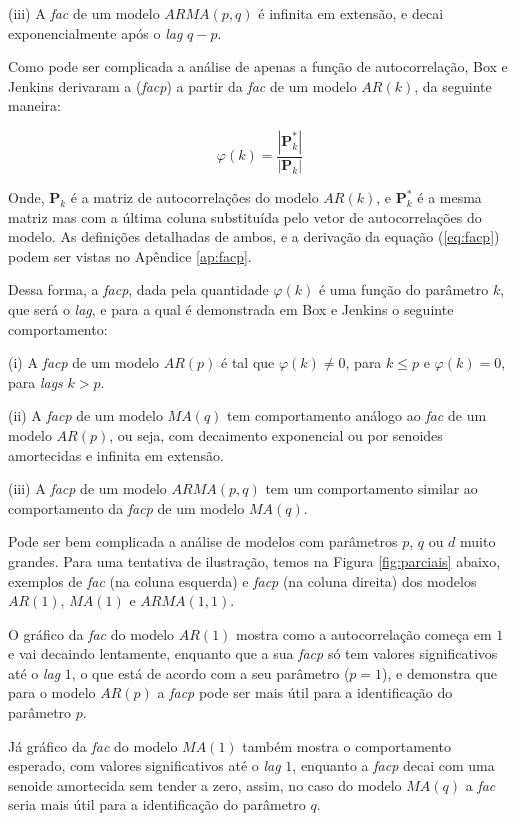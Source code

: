 (iii) A \emph{fac} de um modelo $ARMA(p, q)$ é infinita em extensão, e decai exponencialmente após o \emph{lag} $q{-}p$.

Como pode ser complicada a análise de apenas a função de autocorrelação, Box e Jenkins \citep{box} derivaram a  (\emph{facp}) a partir da \emph{fac} de um modelo $AR(k)$, da seguinte maneira:

\begin{equation}\label{eq:facp}
\varphi(k) = \dfrac{|\mathbf{P}_k^*|}{|\mathbf{P}_k|}
\end{equation}

Onde, $\mathbf{P}_k$ é a matriz de autocorrelações do modelo $AR(k)$, e $\mathbf{P}_k^*$ é a mesma matriz mas com a última coluna substituída pelo vetor de autocorrelações do modelo. As definições detalhadas de ambos, e a derivação da equação (\ref{eq:facp}) podem ser vistas no Apêndice \ref{ap:facp}.

Dessa forma, a \emph{facp}, dada pela quantidade $\varphi(k)$ é uma função do parâmetro $k$, que será o \emph{lag}, e para a qual é demonstrada em Box e Jenkins \citep{box} o seguinte comportamento:

(i) A \emph{facp} de um modelo $AR(p)$ é tal que $\varphi(k) \neq 0$, para $k \leq p$ e $\varphi(k) = 0$, para \emph{lags} $k > p$.

(ii) A \emph{facp} de um modelo $MA(q)$ tem comportamento análogo ao \emph{fac} de um modelo $AR(p)$, ou seja, com decaimento exponencial ou por senoides amortecidas e infinita em extensão.

(iii) A \emph{facp} de um modelo $ARMA(p, q)$ tem um comportamento similar ao comportamento da \emph{facp} de um modelo $MA(q)$.

Pode ser bem complicada a análise de modelos com parâmetros $p$, $q$ ou $d$ muito grandes. Para uma tentativa de ilustração, temos na Figura \ref{fig:parciais} abaixo, exemplos de \emph{fac} (na coluna esquerda) e \emph{facp} (na coluna direita) dos modelos $AR(1)$, $MA(1)$ e $ARMA(1, 1)$.

O gráfico da \emph{fac} do modelo $AR(1)$ mostra como a autocorrelação começa em $1$ e vai decaindo lentamente, enquanto que a sua \emph{facp} só tem valores significativos até o \emph{lag} $1$, o que está de acordo com a seu parâmetro ($p=1$), e demonstra que para o modelo $AR(p)$ a \emph{facp} pode ser mais útil para a identificação do parâmetro $p$.

Já gráfico da \emph{fac} do modelo $MA(1)$ também mostra o comportamento esperado, com valores significativos até o \emph{lag} $1$, enquanto a \emph{facp} decai com uma senoide amortecida sem tender a zero, assim, no caso do modelo $MA(q)$ a \emph{fac} seria mais útil para a identificação do parâmetro $q$.

